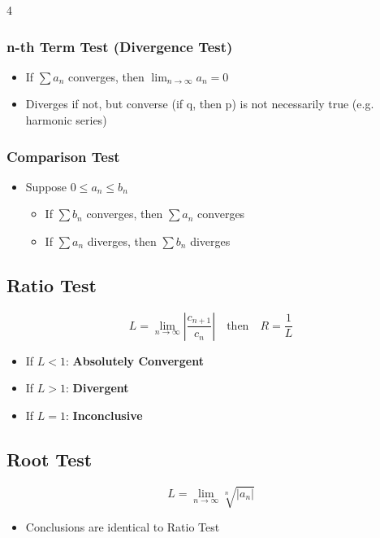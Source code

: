 \documentclass[8pt, landscape, a4paper]{scrartcl}
\begin{document}
\begin{multicols*}{4}
    \subsubsection*{n-th Term Test (Divergence Test)}
    \begin{itemize}
        \item If $\sum a_n$ converges, then $\lim_{n\to\infty} a_n = 0$
        \item Diverges if not, but converse (if q, then p) is not necessarily true (e.g. harmonic series)
    \end{itemize}

    \subsubsection*{Comparison Test}
    \begin{itemize}
        \item {Suppose $0 \leq a_n \leq b_n$}
        \begin{itemize}
            \item {If $\sum b_n$ converges, then $\sum a_n$ converges}
            \item {If $\sum a_n$ diverges, then $\sum b_n$ diverges}
        \end{itemize}
    \end{itemize}

    \subsection*{Ratio Test}
    \[ L = \lim_{n \to \infty} \left|\frac{c_{n+1}}{c_n}\right| \quad \text{then} \quad R = \frac{1}{L} \]
    \begin{itemize}
        \item If $L < 1$: \textbf{Absolutely Convergent}
        \item If $L > 1$: \textbf{Divergent}
        \item If $L = 1$: \textbf{Inconclusive}
    \end{itemize}

    \subsection*{Root Test}
    \[
        L = \lim_{n \to \infty} \sqrt[n]{|a_n|}
    \]
    \begin{itemize}
        \item Conclusions are identical to Ratio Test
    \end{itemize}


\end{multicols*}
\end{document}

